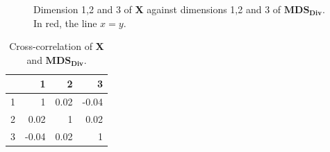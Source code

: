 \documentclass[11pt]{report}
\begin{document}
\begin{figure}[!ht]
    \centering
    \qquad
    \qquad
    \caption{Dimension 1,2 and 3 of \textbf{X} against dimensions 1,2 and 3 of  $\mathbf{MDS_{Div}}$. \newline
            In red, the line $x=y$.}%
    \label{divide_example}%
\end{figure}


\begin{table}[ht]
\centering
\begin{tabular}{rrrr}
 & 1 & 2 & 3 \\ 
  \hline
1 & 1 & 0.02 & -0.04 \\ 
  2 & 0.02 & 1 & 0.02 \\ 
  3 & -0.04 & 0.02 & 1 \\ 
   \hline
\end{tabular}
\caption{Cross-correlation of \textbf{X} and $\mathbf{MDS_{Div}}$.} 
\label{corr_mds}
\end{table}
\end{document}

